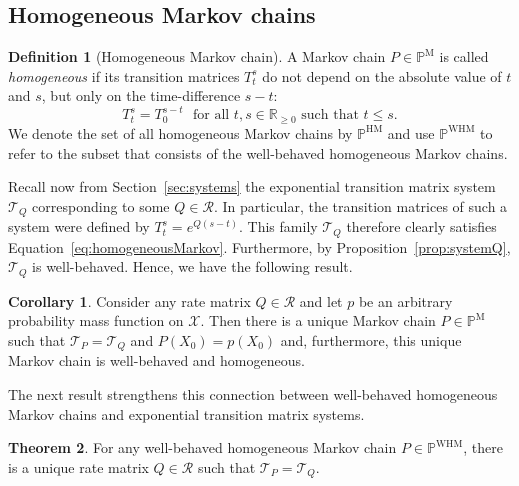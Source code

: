 \documentclass[10pt,a4paper]{paper}
\theoremstyle{definition}
\newtheorem{theorem}{Theorem}[section]
\newtheorem{corollary}[theorem]{Corollary}
\newtheorem{definition}{Definition}
\newcommand{\reals}{\mathbb{R}}
\newcommand{\realsnonneg}{\reals_{\geq 0}}
\newcommand{\states}{\mathcal{X}}
\newcommand{\processes}{\mathbb{P}}
\newcommand{\mprocesses}{\processes^{\mathrm{M}}}
\newcommand{\hmprocesses}{\processes^{\mathrm{HM}}}
\newcommand{\whmprocesses}{\processes^{\mathrm{WHM}}}
\begin{document}
\subsection{Homogeneous Markov chains}\label{sec:homogen_markov_chain}

\begin{definition}[Homogeneous Markov chain]\label{def:homogeneousMarkov}
A Markov chain $P\in\mprocesses$ is called \emph{homogeneous} if its transition matrices $T_t^s$ do not depend on the absolute value of $t$ and $s$, but only on the time-difference $s-t$:
\begin{equation}\label{eq:homogeneousMarkov}
T_t^s=T_0^{s-t}
\text{~~for all $t,s\in\realsnonneg$ such that $t\leq s$.}
\end{equation}
We denote the set of all homogeneous Markov chains by $\hmprocesses$ and use $\whmprocesses$ to refer to the subset that consists of the well-behaved homogeneous Markov chains.
\end{definition}

Recall now from Section~\ref{sec:systems} the exponential transition matrix system $\mathcal{T}_Q$ corresponding to some $Q\in\mathcal{R}$. In particular, the transition matrices of such a system were defined by $T_t^s = e^{Q(s-t)}$. This family $\mathcal{T}_Q$ therefore clearly satisfies Equation~\ref{eq:homogeneousMarkov}. Furthermore, by Proposition~\ref{prop:systemQ}, $\mathcal{T}_Q$ is well-behaved. Hence, we have the following result.

\begin{corollary}\label{cor:rate_has_unique_homogen_markov_process}
Consider any rate matrix $Q\in\mathcal{R}$ and let $p$ be an arbitrary probability mass function on $\states$. Then there is a unique Markov chain $P\in\mprocesses$ such that $\mathcal{T}_P=\mathcal{T}_Q$ and $P(X_0)=p(X_0)$ and, furthermore, this unique Markov chain is well-behaved and homogeneous.
\end{corollary}

The next result strengthens this connection between well-behaved homogeneous Markov chains and exponential transition matrix systems.

\begin{theorem}\label{theo:homogeneoushasQ}
For any well-behaved homogeneous Markov chain $P\in\whmprocesses$, there is a unique rate matrix $Q\in\mathcal{R}$ such that $\mathcal{T}_P=\mathcal{T}_Q$.
\end{theorem}
\end{document}
